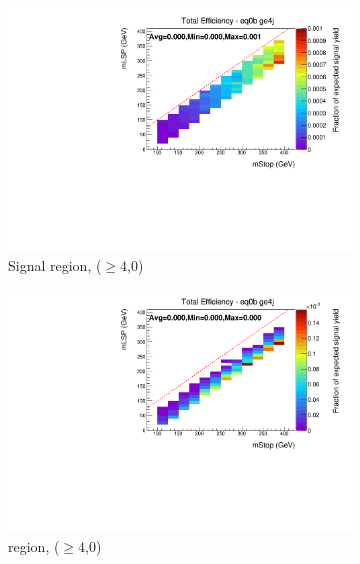 \begin{figure}[ht!]
\begin{subfigure}[b]{0.47\textwidth}
    \includegraphics[width=\textwidth, trim=0 0 0 24, clip=true]{Figs/sms/t2degen/v5/T2_4body_v5_had_eff_maps_eq0b_ge4j_SITV.pdf}
    \caption{Signal region, ($\geq 4$,0)}
    \label{fig:t2_4body_sig_eff_ge4j_0b}
  \end{subfigure}
  \begin{subfigure}[b]{0.47\textwidth}
    \includegraphics[width=\textwidth, trim=0 0 0 24, clip=true]{Figs/sms/t2degen/v5/T2_4body_v5_muon_eff_maps_eq0b_ge4j_SITV.pdf}
    \caption{\mj region, ($\geq 4$,0)}
    \label{fig:t2_4body_mu_eff_ge4j_0b}
  \end{subfigure} \\
  \begin{subfigure}[b]{0.47\textwidth}

\end{subfigure}
\end{figure}
